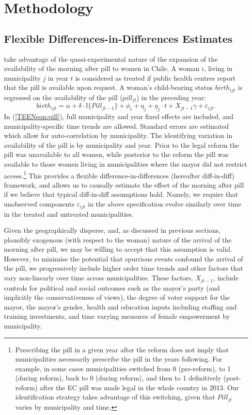 \section{Methodology}
\label{TEENscn:ID}
\subsection{Flexible Differences-in-Differences Estimates}
\Person take advantage of the quasi-experimental nature of the expansion of the 
availability of the morning after pill to women in Chile.  A woman $i$, living
in municipality $j$ in year $t$ is considered as treated if public health 
centres report that the pill is available upon request.  A woman's child-bearing 
status $birth_{ijt}$ is regressed on the availability of the pill ($pill_{jt}$) 
in the preceding year:
\begin{equation}
 \label{TEENeqn:pill}
birth_{ijt} = \alpha + \delta\cdot \mathbb{I}\{Pill_{jt-1}\} + \phi_t + \eta_j + 
\eta_j\cdot t + X_{jt-1}\gamma + \varepsilon_{ijt}.
\end{equation}
In (\ref{TEENeqn:pill}), full municipality and year fixed effects are included,
and municipality-specific time trends are allowed.  Standard errors are 
estimated which allow for auto-correlation by municipality.  The identifying 
variation in availability of the pill is by municipality and year.  Prior to 
the legal reform the pill was unavailable to all women, while posterior to the
reform the pill was available to those women living in municipalities where the
mayor did not restrict access.\footnote{Prescribing the pill in a given year
after the reform does not imply that municipalities necessarily prescribe the 
pill in the years following.  For example, in some cases municipalities 
switched from 0 (pre-reform), to 1 (during reform), back to 0 (during reform), 
and then to 1 definitively (post-reform) after the EC pill was made legal in the 
whole country in 2013.
Our identification strategy takes advantage of this switching, given that 
$Pill_{jt}$ varies by municipality and time.}  This provides a flexible 
difference-in-differences (hereafter diff-in-diff) framework, and allows us to 
causally estimate the effect of the morning after pill if we believe that 
typical diff-in-diff assumptions hold.  Namely, we require that unobserved 
components $\varepsilon_{ijt}$ in the above specification evolve similarly over 
time in the treated and untreated municipalities.

Given the geographically disperse, and, as discussed in previous sections,
plausibly exogenous (with respect to the woman) nature of the arrival of the 
morning after pill, we may be willing to accept that this assumption is valid.  
However, to minimise the potential that spurrious events confound the arrival 
of the pill, we progressively include higher order time trends and other factors 
that vary non-linearly over time across municipalities. These factors, $X_{jt-1}$, 
include controls for political and social outcomes such as the mayor's party
(and implicitly the conservativeness of views), the degree of voter support for
the mayor, the mayor's gender, health and education inputs including staffing
and training investments, and time varying measures of female empowerment by
municipality.


